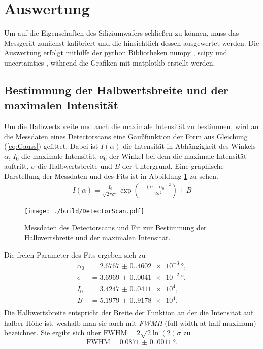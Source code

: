 \section{Auswertung}
\label{sec:Auswertung}

Um auf die Eigenschaften des Siliziumwafers schließen zu können, muss das Messgerät zunächst kalibriert und die hinsichtlich dessen ausgewertet werden.
Die Auswertung erfolgt mithilfe der python Bibliotheken numpy \cite{numpy}, scipy \cite{scipy} und uncertainties \cite{uncertainties}, während die Grafiken mit matplotlib \cite{matplotlib} erstellt werden.

\subsection{Bestimmung der Halbwertsbreite und der maximalen Intensität}
\label{subsec:Halbwertsbreite}

Um die Halbwertsbreite und auch die maximale Intensität zu bestimmen, wird an die Messdaten eines Detectorscans eine Gaußfunktion der Form aus Gleichung (\ref{eq:Gauss}) gefittet. 
Dabei ist $I(\alpha)$ die Intensität in Abhängigkeit des Winkels $\alpha$, $I_0$ die maximale Intensität, $\alpha_0$ der Winkel bei dem die maximale Intensität auftritt, $\sigma$ die Halbwertsbreite und $B$ der Untergrund.
Eine graphische Darstellung der Messdaten und des Fits ist in Abbildung \ref{fig:Gauss} zu sehen.
\begin{align}
    I(\alpha) = \frac{I_0}{\sqrt{2\pi\sigma^2}} \exp\left(-\frac{(\alpha-\alpha_0)^2}{2\sigma^2}\right) +B
    \label{eq:Gauss}
\end{align}
\begin{figure}[H]
    \centering
    \texttt{[image: ./build/DetectorScan.pdf]}
    \caption{Messdaten des Detectorscans und Fit zur Bestimmung der Halbwertsbreite und der maximalen Intensität.}
    \label{fig:Gauss}
\end{figure}
\noindent
Die freien Parameter des Fits ergeben sich zu
\begin{align*}
    \alpha_0 &= \SI{2.6767(0.4602)e-3}{\degree}, \\
    \sigma &= \SI{3.6969(0.0041)e-2}{\degree}, \\
    I_0 &= \SI{3.4247(0.0411)e4},\\
    B &= \SI{5.1979(0.9178)e4}.\\
\end{align*}
Die Halbwertsbreite entspricht der Breite der Funktion an der die Intensität auf halber Höhe ist, weshalb man sie auch mit \textit{FWMH} (full width at half maximum) bezeichnet.
Sie ergibt sich über $\text{FWHM} = 2\sqrt{2\ln(2)}\sigma$ zu
\begin{align*}
    \text{FWHM} = \SI{0.0871(0.0011)}{\degree}.
\end{align*}


